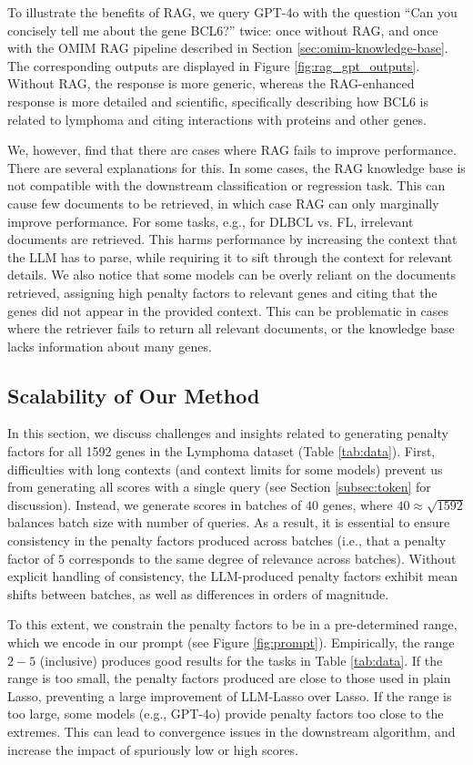 To illustrate the benefits of RAG, we query GPT-4o with the question ``Can you concisely tell me about the gene BCL6?'' twice: once without RAG, and once with the OMIM RAG pipeline described in Section \ref{sec:omim-knowledge-base}.
The corresponding outputs are displayed in Figure \ref{fig:rag_gpt_outputs}.
Without RAG, the response is more generic, whereas the RAG-enhanced response is more detailed and scientific, specifically describing how BCL6 is related to lymphoma and citing interactions with proteins and other genes.

We, however, find that there are cases where RAG fails to improve performance.
There are several explanations for this.
In some cases, the RAG knowledge base is not compatible with the downstream classification or regression task.
This can cause few documents to be retrieved, in which case RAG can only marginally improve performance.
For some tasks, e.g., for DLBCL vs. FL, irrelevant documents are retrieved.
This harms performance by increasing the context that the LLM has to parse, while requiring it to sift through the context for relevant details.
We also notice that some models can be overly reliant on the documents retrieved, assigning high penalty factors to relevant genes and citing that the genes did not appear in the provided context.
This can be problematic in cases where the retriever fails to return all relevant documents, or the knowledge base lacks information about many genes.

\subsection{Scalability of Our Method} \label{appdx:gene-batches}
In this section, we discuss challenges and insights related to generating penalty factors for all 1592 genes in the Lymphoma dataset (Table \ref{tab:data}).
First, difficulties with long contexts (and context limits for some models) prevent us from generating all scores with a single query (see Section \ref{subsec:token} for discussion).
Instead, we generate scores in batches of $40$ genes, where $40 \approx \sqrt{1592}$ balances batch size with number of queries.
As a result, it is essential to ensure consistency in the penalty factors produced across batches (i.e., that a penalty factor of $5$ corresponds to the same degree of relevance across batches).
Without explicit handling of consistency, the LLM-produced penalty factors exhibit mean shifts between batches, as well as differences in orders of magnitude.

To this extent, we constrain the penalty factors to be in a pre-determined range, which we encode in our prompt (see Figure \ref{fig:prompt}).
Empirically, the range $2-5$ (inclusive) produces good results for the tasks in Table \ref{tab:data}.
If the range is too small, the penalty factors produced are close to those used in plain Lasso, preventing a large improvement of LLM-Lasso over Lasso.
If the range is too large, some models (e.g., GPT-4o) provide penalty factors too close to the extremes.
This can lead to convergence issues in the downstream algorithm, and increase the impact of spuriously low or high scores.